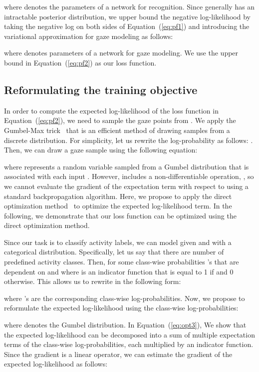 \documentclass[10pt,twocolumn,letterpaper]{article}
\begin{document}
where  denotes the parameters of a network for recognition. Since  generally has an intractable posterior distribution, we upper bound the negative log-likelihood by taking the negative log on both sides of Equation~(\ref{eq:pf1}) and introducing the variational approximation  for gaze modeling as follows:

where  denotes parameters of a network for gaze modeling. We use the upper bound in Equation~(\ref{eq:pf2}) as our loss function.

\subsection{Reformulating the training objective} \label{subsec:objective}
In order to compute the expected log-likelihood of the loss function in Equation~(\ref{eq:pf2}), we need to sample the gaze points from . We apply the Gumbel-Max trick~\cite{maddison2014sampling} that is an efficient method of drawing samples from a discrete distribution. For simplicity, let us rewrite the log-probability as follows: . Then, we can draw a gaze sample  using the following equation:

where  represents a random variable sampled from a Gumbel distribution that is associated with each input . However,  includes a non-differentiable operation, , so we cannot evaluate the gradient of the expectation term with respect to  using a standard backpropagation algorithm. Here, we propose to apply the direct optimization method~\cite{lorberbom2018direct} to optimize the expected log-likelihood term. In the following, we demonstrate that our loss function can be optimized using the direct optimization method.

Since our task is to classify activity labels, we can model  given  and  with a categorical distribution. Specifically, let us say that there are  number of predefined activity classes. Then,  for some class-wise probabilities 's that are dependent on  and  where  is an indicator function that is equal to 1 if  and 0 otherwise. This allows us to rewrite  in the following form:

where 's are the corresponding class-wise log-probabilities. Now, we propose to reformulate the expected log-likelihood using the class-wise log-probabilities:

where  denotes the Gumbel distribution. In Equation~(\ref{eq:opt3}), We show that the expected log-likelihood can be decomposed into a sum of multiple expectation terms of the class-wise log-probabilities, each multiplied by an indicator function. Since the gradient is a linear operator, we can estimate the gradient of the expected log-likelihood as follows:
\end{document}
